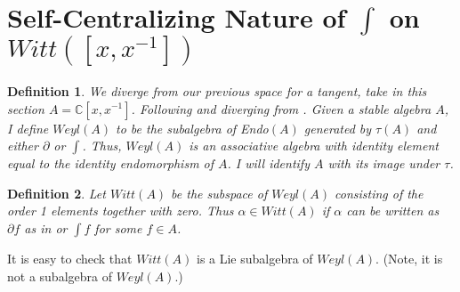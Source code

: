 \documentclass{artjlt}
\newtheorem{defn}{Definition}
\newcommand{\?}{\textbackslash}
\newcommand{\C}{\mathbb{C}}
\begin{document}
\section{Self-Centralizing Nature of $\int$ on $Witt([x,x^{-1}])$}
\begin{defn}
We diverge from our previous space for a tangent, take in this section $A=\C[x,x^{-1}]$. Following \cite{pakianathan2010generalizedwittalgebrasvariable} and diverging from \cite{Dokovic1998}. Given a stable algebra $A$, I define $Weyl(A)$ to be the subalgebra
of Endo$(A)$ generated by $\tau(A)$ and either $\partial$ or $\int$. Thus,
$Weyl(A)$ is an associative algebra with identity element equal to 
the identity endomorphism of $A$. I will identify $A$ with its image under $\tau$.
\end{defn}
\begin{defn}
Let $Witt(A)$ be the subspace of $Weyl(A)$ consisting of the order 1 elements
together with zero. Thus $\alpha \in Witt(A)$ if $\alpha$ can be written
as $\partial f$ as in \cite{pakianathan2010generalizedwittalgebrasvariable} or $\int f$ for some $f \in A$. 
\end{defn}

It is easy to check that $Witt(A)$ is a Lie subalgebra of $Weyl(A)$. (Note,
it is not a subalgebra of $Weyl(A)$.)
\end{document}
